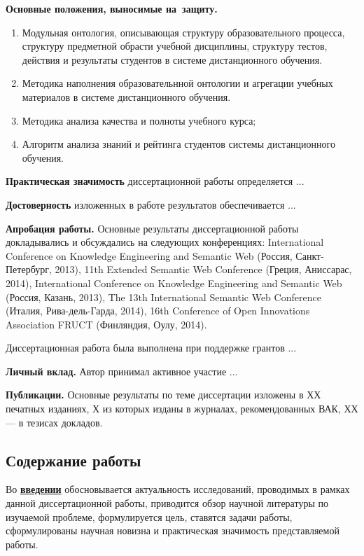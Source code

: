 \textbf{Основные положения, выносимые на~защиту.}
\begin{enumerate}
 \item Модульная онтология, описывающая структуру образовательного процесса, структуру предметной обрасти учебной дисциплины, структуру тестов, действия и результаты студентов в системе дистанционного обучения.
 \item Методика наполнения образовательнной онтологии и агрегации учебных материалов в системе дистанционного обучения.
 \item Методика анализа качества и полноты учебного курса;
 \item Алгоритм анализа знаний и рейтинга студентов системы дистанционного обучения.
 \end{enumerate}



\textbf{Практическая значимость} диссертационной работы определяется ...

\textbf{Достоверность} изложенных в работе результатов обеспечивается ...

\textbf{Апробация работы.}
Основные результаты диссертационной работы докладывались и обсуждались на следующих конференциях:
International Conference on Knowledge Engineering and Semantic Web (Россия, Санкт-Петербург, 2013),
11th Extended Semantic Web Conference (Греция, Аниссарас, 2014), International Conference on Knowledge Engineering and Semantic Web (Россия, Казань, 2013), The 13th International Semantic Web Conference (Италия, Рива-дель-Гарда, 2014), 16th Conference of Open
Innovations Association FRUCT (Финляндия, Оулу, 2014).

Диссертационная работа была выполнена при поддержке грантов ...

\textbf{Личный вклад.} Автор принимал активное участие ...

\textbf{Публикации.} Основные результаты по теме диссертации изложены в ХХ печатных изданиях, Х из которых изданы в журналах, рекомендованных ВАК, ХХ --- в тезисах докладов.


\subsection*{\Large Содержание работы}
Во \underline{\textbf{введении}} обосновывается актуальность исследований, проводимых в рамках данной диссертационной работы, приводится обзор научной литературы по изучаемой проблеме, формулируется цель, ставятся задачи работы, сформулированы научная новизна и практическая значимость представляемой работы.

